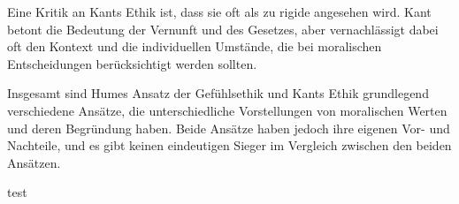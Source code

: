 \documentclass{article}
\begin{document}
Eine Kritik an Kants Ethik ist, dass sie oft als zu rigide angesehen wird. Kant
betont die Bedeutung der Vernunft und des Gesetzes, aber vernachlässigt dabei
oft den Kontext und die individuellen Umstände, die bei moralischen
Entscheidungen berücksichtigt werden sollten.

Insgesamt sind Humes Ansatz der Gefühlsethik und Kants Ethik grundlegend
verschiedene Ansätze, die unterschiedliche Vorstellungen von moralischen Werten
und deren Begründung haben. Beide Ansätze haben jedoch ihre eigenen Vor- und
Nachteile, und es gibt keinen eindeutigen Sieger im Vergleich zwischen den
beiden Ansätzen.


test \cite{foot1996}


\printbibliography
\end{document}
